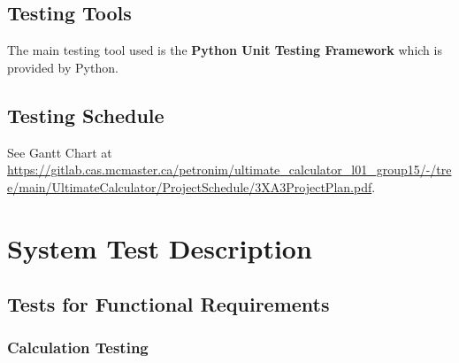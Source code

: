 \documentclass[12pt, titlepage]{article}
\begin{document}
\subsection{Testing Tools}
The main testing tool used is the \textbf{Python Unit Testing Framework} which is provided by Python. 

\subsection{Testing Schedule}
		
See Gantt Chart at \url{https://gitlab.cas.mcmaster.ca/petronim/ultimate_calculator_l01_group15/-/tree/main/UltimateCalculator/ProjectSchedule/3XA3ProjectPlan.pdf}.

\section{System Test Description}
	
\subsection{Tests for Functional Requirements}

\subsubsection{Calculation Testing}
		
\end{document}
